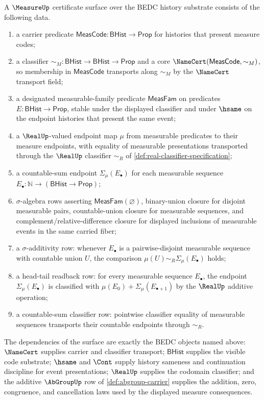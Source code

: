 \begin{definition}
\label{def:measure-certificate-surface}
A $\MeasureUp$ certificate surface over the BEDC history substrate consists of the following data.
\begin{enumerate}
  \item a carrier predicate $\mathsf{MeasCode}:\mathsf{BHist}\to\mathsf{Prop}$ for histories that present measure codes;
  \item a classifier $\sim_M:\mathsf{BHist}\to\mathsf{BHist}\to\mathsf{Prop}$ and a core $\NameCert(\mathsf{MeasCode},\sim_M)$, so membership in $\mathsf{MeasCode}$ transports along $\sim_M$ by the $\NameCert$ transport field;
  \item a designated measurable-family predicate $\mathsf{MeasFam}$ on predicates $E:\mathsf{BHist}\to\mathsf{Prop}$, stable under the displayed classifier and under $\hsame$ on the endpoint histories that present the same event;
  \item a $\RealUp$-valued endpoint map $\mu$ from measurable predicates to their measure endpoints, with equality of measurable presentations transported through the $\RealUp$ classifier $\sim_R$ of \autoref{def:real-classifier-specification};
  \item a countable-sum endpoint $\Sigma_\mu(E_\bullet)$ for each measurable sequence $E_\bullet:\mathbb{N}\to(\mathsf{BHist}\to\mathsf{Prop})$;
  \item $\sigma$-algebra rows asserting $\mathsf{MeasFam}(\varnothing)$, binary-union closure for disjoint measurable pairs, countable-union closure for measurable sequences, and complement/relative-difference closure for displayed inclusions of measurable events in the same carried fiber;
  \item a $\sigma$-additivity row: whenever $E_\bullet$ is a pairwise-disjoint measurable sequence with countable union $U$, the comparison $\mu(U)\sim_R\Sigma_\mu(E_\bullet)$ holds;
  \item a head-tail readback row: for every measurable sequence $E_\bullet$, the endpoint $\Sigma_\mu(E_\bullet)$ is classified with $\mu(E_0)+\Sigma_\mu(E_{\bullet+1})$ by the $\RealUp$ additive operation;
  \item a countable-sum classifier row: pointwise classifier equality of measurable sequences transports their countable endpoints through $\sim_R$.
\end{enumerate}
The dependencies of the surface are exactly the BEDC objects named above: $\NameCert$ supplies carrier and classifier transport; $\mathsf{BHist}$ supplies the visible code substrate; $\hsame$ and $\Cont$ supply history sameness and continuation discipline for event presentations; $\RealUp$ supplies the codomain classifier; and the additive $\AbGroupUp$ row of \autoref{def:abgroup-carrier} supplies the addition, zero, congruence, and cancellation laws used by the displayed measure consequences.
\end{definition}

